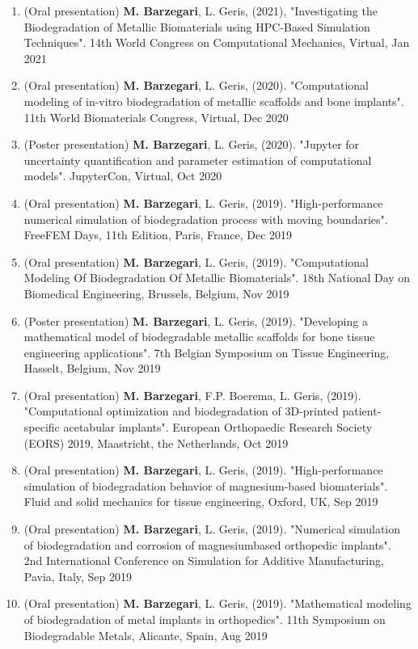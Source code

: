 \documentclass{cv}
\begin{document}
\begin{enumerate}
\item
(Oral presentation)
\textbf{M. Barzegari}, L. Geris, (2021), "Investigating the Biodegradation of Metallic Biomaterials using HPC-Based Simulation Techniques". 14th World Congress on Computational Mechanics, Virtual, Jan 2021
\item
(Oral presentation) 
\textbf{M. Barzegari}, L. Geris, (2020). "Computational modeling of in-vitro biodegradation of metallic scaffolds and bone implants". 11th World Biomaterials Congress, Virtual, Dec 2020
\item
(Poster presentation) 
\textbf{M. Barzegari}, L. Geris, (2020). "Jupyter for uncertainty quantification and parameter estimation of computational models". JupyterCon, Virtual, Oct 2020
\item
(Oral presentation) 
\textbf{M. Barzegari}, L. Geris, (2019). "High-performance numerical simulation of biodegradation process with moving boundaries". FreeFEM Days, 11th Edition, Paris, France, Dec 2019
\item
(Oral presentation) 
\textbf{M. Barzegari}, L. Geris, (2019). "Computational Modeling Of Biodegradation Of Metallic Biomaterials". 18th National Day on Biomedical Engineering, Brussels, Belgium, Nov 2019
\item
(Poster presentation) 
\textbf{M. Barzegari}, L. Geris, (2019). "Developing a mathematical model of biodegradable metallic scaffolds for bone tissue engineering applications". 7th Belgian Symposium on Tissue Engineering, Hasselt, Belgium, Nov 2019
\item
(Oral presentation) 
\textbf{M. Barzegari}, F.P. Boerema, L. Geris, (2019). "Computational optimization and biodegradation of 3D-printed patient-specific acetabular implants". European Orthopaedic Research Society (EORS) 2019, Maastricht, the Netherlands, Oct 2019
\item
(Oral presentation) 
\textbf{M. Barzegari}, L. Geris, (2019). "High-performance simulation of biodegradation behavior of magnesium-based biomaterials". Fluid and solid mechanics for tissue engineering, Oxford, UK, Sep 2019
\item
(Oral presentation) 
\textbf{M. Barzegari}, L. Geris, (2019). "Numerical simulation of biodegradation and corrosion of magnesiumbased orthopedic implants". 2nd International Conference on Simulation for Additive Manufacturing, Pavia, Italy, Sep 2019
\item
(Oral presentation) 
\textbf{M. Barzegari}, L. Geris, (2019). "Mathematical modeling of biodegradation of metal implants in orthopedics". 11th Symposium on Biodegradable Metals, Alicante, Spain, Aug 2019
\end{enumerate}
\end{document}
